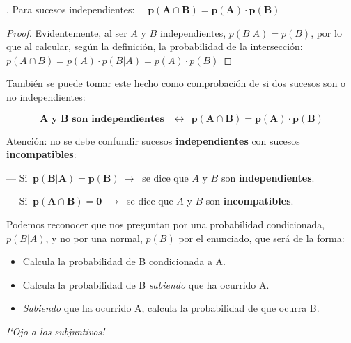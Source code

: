 \begin{theorem}
. Para sucesos	independientes: $\quad \boldsymbol{ p(A\cap B)=p(A)\cdot p(B)}$
\end{theorem}
\begin{proof}
Evidentemente, al ser $A$ y $B$ independientes, 	$p(B|A)=p(B)$, por lo que al calcular, según la definición, la probabilidad de la intersección:
$p(A\cap B)=p(A)\cdot p(B|A) = p(A)\cdot p(B)$
\end{proof}

\begin{destacado}
También se puede tomar este hecho como comprobación de si dos sucesos son o no independientes:
 
$$ \boldsymbol{ A \textbf{ y } B \textbf{ son independientes } \ \ \longleftrightarrow \ \ p(A\cap B)=p(A)\cdot p(B) }  $$	
\end{destacado}

\begin{destacado}
Atención: no se debe confundir sucesos \textbf{independientes} con sucesos \textbf{incompatibles}:	

--- Si $\  \boldsymbol{ p(B|A)=p(B)\ \to \ }$ se dice que $A$ y $B$ son \textbf{independientes}.

--- Si $\  \boldsymbol{ p(A\cap B)=0 \ \ \to \ }$ se dice que $A$ y $B$ son \textbf{incompatibles}.

\end{destacado}

Podemos reconocer que nos preguntan por una probabilidad condicionada, $p(B|A)$, y no por una normal, $p(B)$ por el enunciado, que será de la forma:

\begin{itemize}
\vspace{-2mm} \item Calcula la probabilidad de B condicionada a A.
\vspace{-2mm} \item Calcula la probabilidad de B \emph{sabiendo} que ha ocurrido A.	
\vspace{-2mm} \item \emph{Sabiendo} que ha ocurrido A, calcula la probabilidad de que ocurra B.
\end{itemize}
\vspace{-2mm} \textcolor{gris}{\emph{!`Ojo a los subjuntivos!}}

